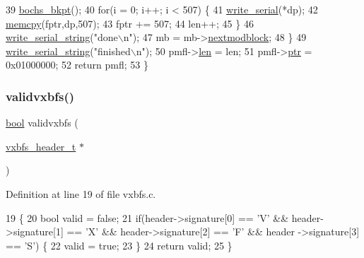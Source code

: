 \begin{DoxyCode}
39         \hyperlink{a00158_a3f7e7be8f62f43b2b62df54cac1590be_a3f7e7be8f62f43b2b62df54cac1590be}{bochs\_bkpt}();
40         \textcolor{keywordflow}{for}(i = 0; i++; i < 507) \{
41             \hyperlink{a00050_aac3c84e21fffc4696d8969ca6955bfc8_aac3c84e21fffc4696d8969ca6955bfc8}{write\_serial}(*dp);
42             \hyperlink{a00125_a370712322c794e949c996946f2283ea8_a370712322c794e949c996946f2283ea8}{memcpy}(fptr,dp,507);
43             fptr += 507;
44             len++;
45         \}
46         \hyperlink{a00050_aabbe45d6670f606c53ba38a5fb14b650_aabbe45d6670f606c53ba38a5fb14b650}{write\_serial\_string}(\textcolor{stringliteral}{"done\(\backslash\)n"});
47         mb = mb->\hyperlink{a00326_afbf261c73a36b4d33e8a8b5179d4385b_afbf261c73a36b4d33e8a8b5179d4385b}{nextmodblock};
48     \}
49     \hyperlink{a00050_aabbe45d6670f606c53ba38a5fb14b650_aabbe45d6670f606c53ba38a5fb14b650}{write\_serial\_string}(\textcolor{stringliteral}{"finished\(\backslash\)n"});
50     pmfl->\hyperlink{a00310_a151dcc6387f9c9186b4b84526c3a89ff_a151dcc6387f9c9186b4b84526c3a89ff}{len} = len;
51     pmfl->\hyperlink{a00310_ac769ba8a7086d818e1137ce59dd21077_ac769ba8a7086d818e1137ce59dd21077}{ptr} = 0x01000000;
52     \textcolor{keywordflow}{return} pmfl;
53 \}
\end{DoxyCode}
\mbox{\label{a00200_a4d38ed022dd74a1ef381240419f8fd72_a4d38ed022dd74a1ef381240419f8fd72}} 
\subsubsection{\texorpdfstring{validvxbfs()}{validvxbfs()}}
{\footnotesize\ttfamily \hyperlink{a00134_af6a258d8f3ee5206d682d799316314b1_af6a258d8f3ee5206d682d799316314b1}{bool} validvxbfs (\begin{DoxyParamCaption}\item[{\hyperlink{a00200_ac5678b6d5dd5ed5ca86e5ccd4c30d39d_ac5678b6d5dd5ed5ca86e5ccd4c30d39d}{vxbfs\+\_\+header\+\_\+t} $\ast$}]{ }\end{DoxyParamCaption})}



Definition at line 19 of file vxbfs.\+c.


\begin{DoxyCode}
19                                         \{
20     \textcolor{keywordtype}{bool} valid = \textcolor{keyword}{false};
21     \textcolor{keywordflow}{if}(header->signature[0] == \textcolor{charliteral}{'V'} && header->signature[1] == \textcolor{charliteral}{'X'} && header->signature[2] == \textcolor{charliteral}{'F'} && header
      ->signature[3] == \textcolor{charliteral}{'S'}) \{
22         valid = \textcolor{keyword}{true};
23     \}
24     \textcolor{keywordflow}{return} valid;
25 \}
\end{DoxyCode}
